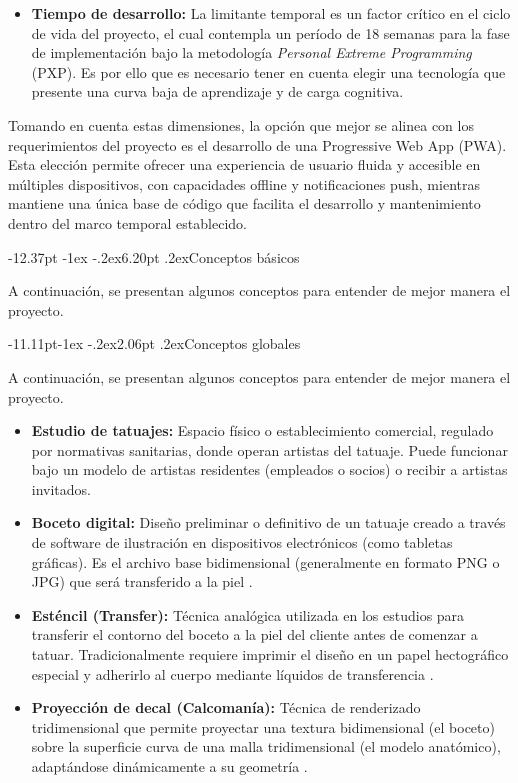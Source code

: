 \documentclass[12pt,letterpaper,oneside]{report}
\makeatletter
\renewcommand\section{\@startsection{section}{1}{\z@}%
  {-12.37pt \@plus -1ex \@minus -.2ex}{6.20pt \@plus.2ex}{\normalfont\large\bfseries}}
\renewcommand\subsection{\@startsection{subsection}{2}{\z@}%
  {-11.11pt\@plus -1ex \@minus -.2ex}{2.06pt \@plus .2ex}{\normalfont\normalsize\bfseries}}
\makeatother
\begin{document}
\begin{itemize}
  \item \textbf{Tiempo de desarrollo:} La limitante temporal es un factor crítico en el ciclo de vida del proyecto, el cual contempla un período de 18 semanas para la fase de implementación bajo la metodología \textit{Personal Extreme Programming} (PXP). Es por ello que es necesario tener en cuenta elegir una tecnología que presente una curva baja de aprendizaje y de carga cognitiva.
\end{itemize}

Tomando en cuenta estas dimensiones, la opción que mejor se alinea con los requerimientos del proyecto es el desarrollo de una Progressive Web App (PWA). Esta elección permite ofrecer una experiencia de usuario fluida y accesible en múltiples dispositivos, con capacidades offline y notificaciones push, mientras mantiene una única base de código que facilita el desarrollo y mantenimiento dentro del marco temporal establecido.

\section{Conceptos básicos}

A continuación, se presentan algunos conceptos para entender de mejor manera el proyecto.

\subsection{Conceptos globales }

A continuación, se presentan algunos conceptos para entender de mejor manera el proyecto.

\begin{itemize}
  \item \textbf{Estudio de tatuajes:} Espacio físico o establecimiento comercial, regulado por normativas sanitarias, donde operan artistas del tatuaje. Puede funcionar bajo un modelo de artistas residentes (empleados o socios) o recibir a artistas invitados.

  \item \textbf{Boceto digital:} Diseño preliminar o definitivo de un tatuaje creado a través de software de ilustración en dispositivos electrónicos (como tabletas gráficas). Es el archivo base bidimensional (generalmente en formato PNG o JPG) que será transferido a la piel \cite{baguena2008}.

  \item \textbf{Esténcil (Transfer):} Técnica analógica utilizada en los estudios para transferir el contorno del boceto a la piel del cliente antes de comenzar a tatuar. Tradicionalmente requiere imprimir el diseño en un papel hectográfico especial y adherirlo al cuerpo mediante líquidos de transferencia \cite{jordan2009}.

  \item \textbf{Proyección de decal (Calcomanía):} Técnica de renderizado tridimensional que permite proyectar una textura bidimensional (el boceto) sobre la superficie curva de una malla tridimensional (el modelo anatómico), adaptándose dinámicamente a su geometría \cite{akenine2018}.
\end{itemize}
\end{document}
